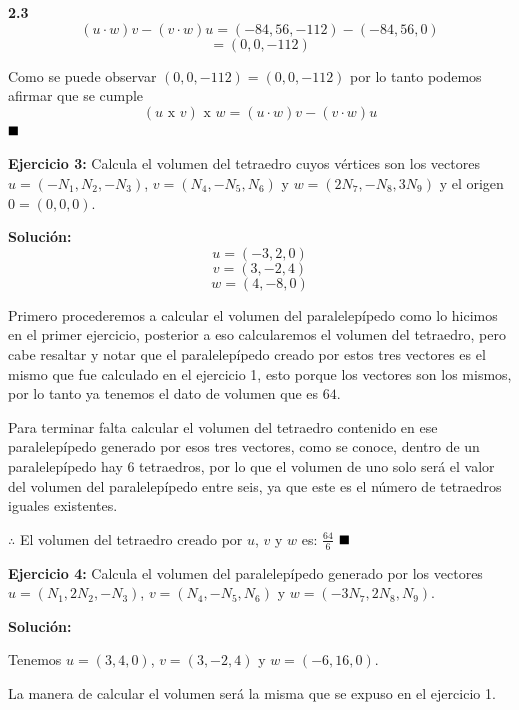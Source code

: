 \documentclass{article}
\begin{document}
\begin{minipage}[c]{0.5cm}
    \textbf{2.3}
    $$(u\cdot w)v -(v\cdot w)u = (-84, 56, -112)- (-84, 56 , 0)$$
    $$= (0, 0, -112)$$
\end{minipage}
\vspace{10pt}

Como se puede observar $(0, 0, -112) = (0, 0, -112)$ por lo tanto podemos afirmar que se cumple 
$$(u \text{ x } v)\text{ x }w = (u\cdot w)v -(v\cdot w)u$$
$\hfill\blacksquare$
\vspace*{10pt}

\textbf{Ejercicio 3:} Calcula el volumen del tetraedro cuyos vértices son los vectores $u = (-N_1,N_2,-N_3)$, $v = (N_4, -N_5,N_6)$ y 
$w= (2N_7, -N_8, 3N_9)$ y el origen $0 =(0,0,0)$. 
\vspace{10pt}

\textbf{Solución:}
$$u = (-3,2,0)$$
$$v = (3, -2,4)$$
$$w= (4, -8, 0)$$

Primero procederemos a calcular el volumen del paralelepípedo como lo hicimos en el primer ejercicio, posterior a eso calcularemos el volumen del 
tetraedro, pero cabe resaltar y notar que el paralelepípedo creado por estos tres vectores es el mismo que fue calculado en el ejercicio 1, esto 
porque los vectores son los mismos, por lo tanto ya tenemos el dato de volumen que es $64$.

Para terminar falta calcular el volumen del tetraedro contenido en ese paralelepípedo generado por esos tres vectores, como se conoce, dentro de un 
paralelepípedo hay 6 tetraedros, por lo que el volumen de uno solo será el valor del volumen del paralelepípedo entre seis, ya que este es el número de 
tetraedros iguales existentes.

$\therefore$ El volumen del tetraedro creado por $u$, $v$ y $w$ es: $\frac{64}{6}$
$\hfill\blacksquare$
\vspace{10pt}

\textbf{Ejercicio 4:} Calcula el volumen del paralelepípedo generado por los vectores $u =(N_1, 2N_2,-N_3)$, $v = (N_4, -N_5,N_6)$ y 
$w = (-3N_7, 2N_8, N_9)$.
\vspace{10pt}

\textbf{Solución:}
\vspace*{10pt}

Tenemos $u =(3, 4,0)$, $v = (3, -2,4)$ y $w = (-6, 16, 0)$.

La manera de calcular el volumen será la misma que se expuso en el ejercicio 1.
\end{document}
